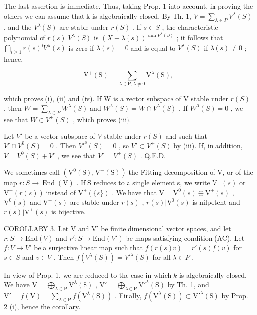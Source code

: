 The last assertion is immediate. Thus, taking Prop. 1 into account, in proving the others we can assume that k is algebraically closed. By Th. 1, \(V = \sum_{\lambda \in P} V^{\lambda}(S)\) , and the \(V^{\lambda}(S)\) are stable under \(r(S)\) . If \(s \in S\) , the characteristic polynomial of \(r(s)|V^{\lambda}(S)\) is \((X - \lambda(s))^{\dim V^{\lambda}(S)}\) ; it follows that \(\bigcap_{i \geq 1} r(s)^{i} V^{\lambda}(s)\) is zero if \(\lambda(s) = 0\) and is equal to \(V^{\lambda}(S)\) if \(\lambda(s) \neq 0\) ; hence,

\[
\mathrm{V} ^ {+} (\mathrm{S}) = \sum_ {\lambda \in \mathrm{P}, \lambda \neq 0} \mathrm{V} ^ {\lambda} (\mathrm{S}),\tag{3}
\]

which proves (i), (ii) and (iv). If W is a vector subspace of V stable under \(r(S)\) , then \(W = \sum_{\lambda \in P} W^{\lambda}(S)\) and \(W^{\lambda}(S) = W \cap V^{\lambda}(S)\) . If \(W^{0}(S) = 0\) , we see that \(W \subset V^{+}(S)\) , which proves (iii).

Let \(V'\) be a vector subspace of \(V\) stable under \(r(S)\) and such that \(V' \cap V^0(S) = 0\) . Then \(V'^0(S) = 0\) , so \(V' \subset V^+(S)\) by (iii). If, in addition, \(V = V^0(S) + V'\) , we see that \(V' = V^+(S)\) . Q.E.D.

We sometimes call \((\mathrm{V}^{0}(\mathrm{S}),\mathrm{V}^{+}(\mathrm{S}))\) the Fitting decomposition of V, or of the map \(r:S\to\operatorname{End}(\mathrm{V})\) . If S reduces to a single element s, we write \(\mathrm{V}^{+}(s)\) or \(\mathrm{V}^{+}(r(s))\) instead of \(\mathrm{V}^{+}(\{s\})\) . We have that \(\mathrm{V}=\mathrm{V}^{0}(s)\oplus\mathrm{V}^{+}(s)\) , \(\mathrm{V}^{0}(s)\) and \(\mathrm{V}^{+}(s)\) are stable under \(r(s)\) , \(r(s)|\mathrm{V}^{0}(s)\) is nilpotent and \(r(s)|\mathrm{V}^{+}(s)\) is bijective.

COROLLARY 3. Let V and V' be finite dimensional vector spaces, and let \(r: S \to \text{End}(V)\) and \(r': S \to \text{End}(V')\) be maps satisfying condition (AC). Let \(f: V \to V'\) be a surjective linear map such that \(f(r(s)v) = r'(s)f(v)\) for \(s \in S\) and \(v \in V\) . Then \(f(V^{\lambda}(S)) = V'^{\lambda}(S)\) for all \(\lambda \in P\) .

In view of Prop. 1, we are reduced to the case in which \(k\) is algebraically closed. We have \(\mathrm{V} = \bigoplus_{\lambda \in \mathrm{P}} \mathrm{V}^{\lambda}(\mathrm{S})\) , \(\mathrm{V}' = \bigoplus_{\lambda \in \mathrm{P}} \mathrm{V}'^{\lambda}(\mathrm{S})\) by Th. 1, and \(\mathrm{V}' = f(\mathrm{V}) = \sum_{\lambda \in \mathrm{P}} f(\mathrm{V}^{\lambda}(\mathrm{S}))\) . Finally, \(f(\mathrm{V}^{\lambda}(\mathrm{S})) \subset \mathrm{V}'^{\lambda}(\mathrm{S})\) by Prop. 2 (i), hence the corollary.

